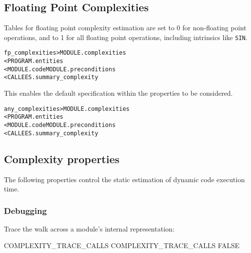 \documentclass[a4paper]{report}
\newenvironment{PipsMake}{\begin{alltt}}{\end{alltt}}
\newenvironment{PipsPass}[1]{\label{pass:#1}}{}
\begin{document}
\subsection{Floating Point Complexities}
\label{subsubsection-floating-point-complexities}

\begin{PipsPass}{fp_complexities}
Tables for floating point complexity estimation are set to 0 for
non-floating point operations, and to 1 for all floating point
operations, including intrinsics like \texttt{SIN}.
\end{PipsPass}

\begin{PipsMake}
fp_complexities                    > MODULE.complexities
        < PROGRAM.entities
        < MODULE.code MODULE.preconditions
        < CALLEES.summary_complexity
\end{PipsMake}

\begin{PipsPass}{any_complexities}
This enables the default specification within the properties to
be considered.
\end{PipsPass}

\begin{PipsMake}
any_complexities                    > MODULE.complexities
        < PROGRAM.entities
        < MODULE.code MODULE.preconditions
        < CALLEES.summary_complexity
\end{PipsMake}

\subsection{Complexity properties}


The following properties control the static estimation of dynamic code
execution time.

\subsubsection{Debugging}

Trace the walk across a module's internal representation:

\begin{PipsProp}{COMPLEXITY_TRACE_CALLS}
COMPLEXITY_TRACE_CALLS FALSE
\end{PipsProp}
\end{document}
